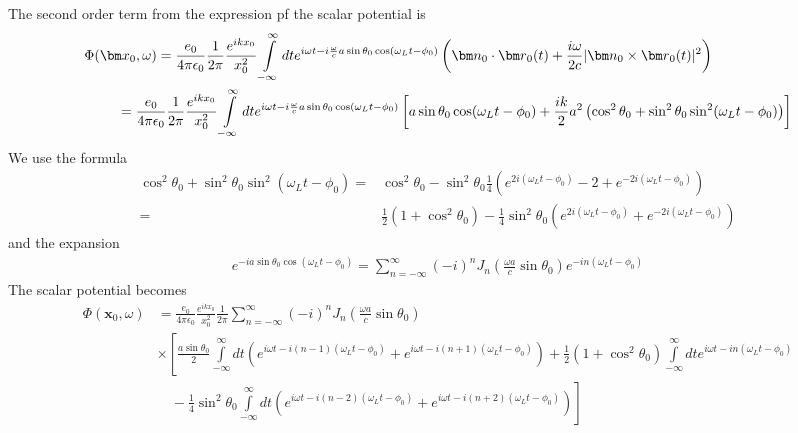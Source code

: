 The second order term from the expression pf the scalar potential is
\begin{align}
    \Phi({\bm x}_0,\omega) & =\frac{e_0}{4\pi\epsilon_0}\frac1{2\pi}\frac{e^{ikx_0}}{x_0^2}\int\limits_{-\infty}^{\infty}dt e^{i\omega t-i\frac{\omega}ca\sin\theta_0\cos(\omega_Lt-\phi_0)}\left({{\bm n}_0\cdot{\bm r}_0(t)}+\frac{i\omega}{2c}{|{\bm n}_0\times{\bm r}_0(t)|^2}       \right)\nonumber                                    \\
                           & \hspace*{-1cm}=\frac{e_0}{4\pi\epsilon_0}\frac1{2\pi}\frac{e^{ikx_0}}{x_0^2}\int\limits_{-\infty}^{\infty}dt e^{i\omega t-i\frac{\omega}ca\sin\theta_0\cos(\omega_Lt-\phi_0)}\left[a\sin\theta_0\cos(\omega_Lt-\phi_0) +\frac{ik}2a^2\left(\cos^2\theta_0+\sin^2\theta_0\sin^2(\omega_Lt -\phi_0)\right)\right]
\end{align}
We use the formula
\begin{align}
    \cos^2\theta_0+\sin^2\theta_0\sin^2(\omega_Lt-\phi_0)= & \cos^2\theta_0-\sin^2\theta_0\frac14\left(e^{2i(\omega_Lt-\phi_0)}-2+e^{-2i(\omega_Lt-\phi_0)}\right)\nonumber \\
    =                                                      & \frac12(1+\cos^2\theta_0)-\frac14\sin^2\theta_0(e^{2i(\omega_Lt -\phi_0)}+e^{-2i(\omega_Lt -\phi_0)})
\end{align}
and the expansion
\begin{align}
    e^{-ia\sin\theta_0\cos(\omega_Lt-\phi_0)}=\sum_{n=-\infty}^{\infty} (-i)^n J_n(\frac{\omega a}c\sin\theta_0) e^{-i n (\omega_Lt-\phi_0)}
\end{align}
The scalar potential becomes
\begin{align}
    \Phi({\bm x}_0,\omega) & =\frac{e_0}{4\pi\epsilon_0}\frac{e^{ikx_0}}{x_0^2}\frac1{2\pi}\sum\limits_{n=-\infty}^{\infty}(-i)^nJ_n(\frac{\omega a}c\sin\theta_0)\nonumber                     \\
                           & \times\left[\frac{a\sin\theta_0}2\int\limits_{-\infty}^{\infty}dt\left(e^{i\omega t-i(n-1)(\omega_Lt-\phi_0)}+e^{i\omega t-i(n+1)(\omega_Lt-\phi_0)}\right)\right.
    +\frac12(1+\cos^2\theta_0)\int\limits_{-\infty}^{\infty}dte^{i\omega t-in(\omega_Lt-\phi_0)}\nonumber                                                                                       \\
                           & \left.\quad-\frac14\sin^2\theta_0\int\limits_{-\infty}^{\infty}dt\left(e^{i\omega t-i(n-2)(\omega_Lt-\phi_0)}+e^{i\omega t-i(n+2)(\omega_Lt-\phi_0)}\right)\right]
\end{align}

